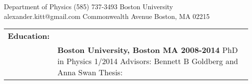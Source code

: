 {
\begin{singlespace}
		\newcommand{\hsect}[2]{
			\setlength{\leftskip}{#1}
			\setlength{\parindent}{-#1}
			\setlength{\parskip}{#2}
		}

		\newcommand{\Lhind}[0]{15pt}
		\newcommand{\sspace}[0]{.2 cm }
		\newcommand{\sect}[2]{
			\noindent \begin{tabular}{@{} p{.1 \textwidth} p{.85 \textwidth}}
			\noindent \textbf{#1:} & \\
			& 
			\hsect{\Lhind}{\sspace}
			#2
			\end{tabular}
			
			\bigspace
		}

		\newcommand{\dated  }[2]{#1 \hfill #2}
		\newcommand{\datedbf}[2]{\textbf{#1 \hfill #2} } %

		\newcommand{\present}[2]{``#1'' \newline #2}

		\newcommand{\pub}[3]{
			#1 \newline
			``#2'' \newline
			#3
		}


		\newcommand{\bigspace}[0]{\vspace{.3 cm} }

 \newline
Department of Physics \hfill (585) 737-3493 \newline
Boston University \hfill alexander.kitt@gmail.com  Commonwealth Avenue \newline
Boston, MA 02215\newline

\bigspace

\sect{Education}
{
	\datedbf{Boston University, Boston MA}{2008-2014}\newline
	PhD in Physics 1/2014\newline
	Advisors: Bennett B Goldberg and Anna Swan \newline
	Thesis: \thesistitlelower 

}
\end{singlespace}}
